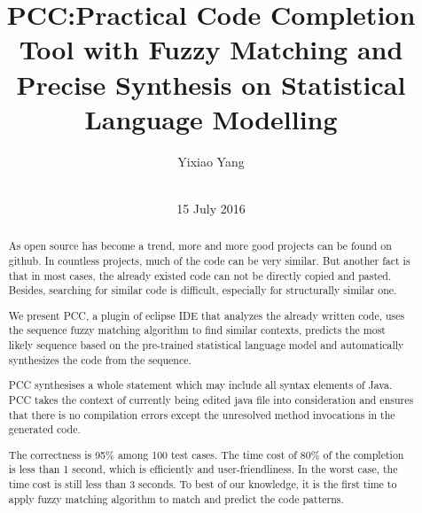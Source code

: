 \documentclass{sig-alternate-05-2015}
\begin{document}


\title{PCC:Practical Code Completion Tool with Fuzzy Matching and Precise Synthesis on Statistical Language Modelling}\vspace{-2cm}

\author{
\alignauthor
Yixiao Yang \\
        \\
}
\date{15 July 2016}
\maketitle
\begin{abstract}
As open source has become a trend, more and more good projects can be found on github. In countless projects, much of the code can be very similar. But another fact is that in most cases, the already existed code can not be directly copied and pasted. Besides, searching for similar code is difficult, especially for structurally similar one.


We present PCC, a plugin of eclipse IDE that analyzes the already written code, uses the sequence fuzzy matching algorithm to find similar contexts, predicts the most likely sequence based on the pre-trained statistical language model and automatically synthesizes the code from the sequence.

PCC synthesises a whole statement which may include all syntax elements of Java. PCC takes the context of currently being edited java file into consideration and ensures that there is no compilation errors except the unresolved method invocations in the generated code.

The correctness is 95\% among 100 test cases. The time cost of 80\% of the completion is less than 1 second, which is efficiently and user-friendliness. In the worst case, the time cost is still less than 3 seconds. To best of our knowledge, it is the first time to apply fuzzy matching algorithm to match and predict the code patterns.
\end{abstract}
\end{document}
